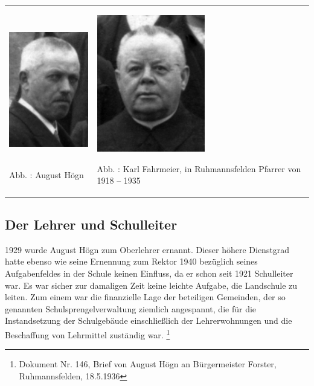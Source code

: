 \documentclass[a4paper]{article}
\newcounter{Abb}
\renewcommand\theAbb{\arabic{Abb}}
\begin{document}
\begin{center}
\begin{minipage}{9.638cm}
\begin{center}
\tablefirsthead{}
\tablehead{}
\tabletail{}
\tablelasttail{}
\begin{supertabular}{m{4.333cm}m{4.905cm}}

\includegraphics[width=4.15cm,height=6.006cm]{pictures/zulassungsarbeit-img002.jpg}

Abb. \stepcounter{Abb}{\theAbb}: August Högn &

\includegraphics[width=4.722cm,height=5.994cm]{pictures/zulassungsarbeit-img029.jpg}

Abb. \stepcounter{Abb}{\theAbb}: Karl Fahrmeier, in Ruhmannsfelden
Pfarrer von 1918 – 1935\\
\end{supertabular}
\end{center}
\end{minipage}
\end{center}
\clearpage\subsection{Der Lehrer und Schulleiter}
\hypertarget{RefHeadingToc100333733}{}1929 wurde August Högn zum
Oberlehrer ernannt. Dieser höhere Dienstgrad hatte ebenso wie seine
Ernennung zum Rektor 1940 bezüglich seines Aufgabenfeldes in der Schule
keinen Einfluss, da er schon seit 1921 Schulleiter war. Es war sicher
zur damaligen Zeit keine leichte Aufgabe, die Landschule zu leiten. Zum
einem war die finanzielle Lage der beteiligen Gemeinden, der so
genannten Schulsprengelverwaltung ziemlich angespannt, die für die
Instandsetzung der Schulgebäude einschließlich der Lehrerwohnungen und
die Beschaffung von Lehrmittel zuständig war. \footnote{Dokument Nr.
146, Brief von August Högn an Bürgermeister Forster, Ruhmannsfelden,
18.5.1936}
\end{document}
